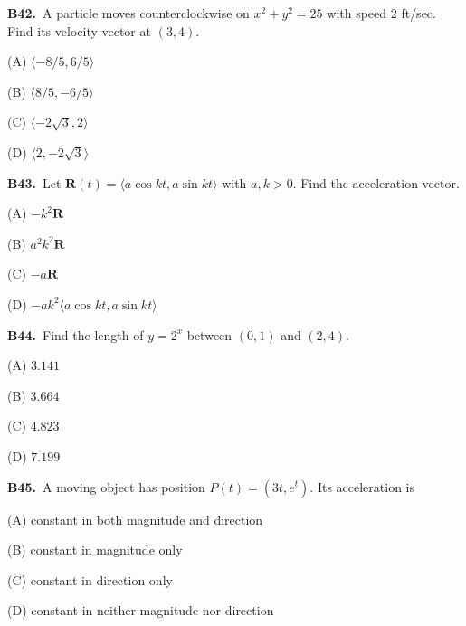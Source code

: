 \documentclass[11pt]{article}
\begin{document}
\bigskip\noindent\textbf{B42.}\ A particle moves counterclockwise on $x^2+y^2=25$ with speed 2 ft/sec. Find its velocity vector at $(3,4)$.
\begin{list}{}{\setlength{\leftmargin}{3em}\setlength{\labelwidth}{2.5em}\setlength{\itemsep}{0pt}\setlength{\topsep}{2pt}}
\item[(A)] $\langle-8/5,6/5\rangle$
\item[(B)] $\langle8/5,-6/5\rangle$
\item[(C)] $\langle-2\sqrt3,2\rangle$
\item[(D)] $\langle2,-2\sqrt3\rangle$
\end{list}

\bigskip\noindent\textbf{B43.}\ Let $\mathbf R(t)=\langle a\cos kt,a\sin kt\rangle$ with $a,k>0$. Find the acceleration vector.
\begin{list}{}{\setlength{\leftmargin}{3em}\setlength{\labelwidth}{2.5em}\setlength{\itemsep}{0pt}\setlength{\topsep}{2pt}}
\item[(A)] $-k^2\mathbf R$
\item[(B)] $a^2k^2\mathbf R$
\item[(C)] $-a\mathbf R$
\item[(D)] $-ak^2\langle a\cos kt,a\sin kt\rangle$
\end{list}

\bigskip\noindent\textbf{B44.}\ Find the length of $y=2^x$ between $(0,1)$ and $(2,4)$.
\begin{list}{}{\setlength{\leftmargin}{3em}\setlength{\labelwidth}{2.5em}\setlength{\itemsep}{0pt}\setlength{\topsep}{2pt}}
\item[(A)] $3.141$
\item[(B)] $3.664$
\item[(C)] $4.823$
\item[(D)] $7.199$
\end{list}

\bigskip\noindent\textbf{B45.}\ A moving object has position $P(t)=(3t,e^t)$. Its acceleration is
\begin{list}{}{\setlength{\leftmargin}{3em}\setlength{\labelwidth}{2.5em}\setlength{\itemsep}{0pt}\setlength{\topsep}{2pt}}
\item[(A)] constant in both magnitude and direction
\item[(B)] constant in magnitude only
\item[(C)] constant in direction only
\item[(D)] constant in neither magnitude nor direction
\end{list}
\end{document}
